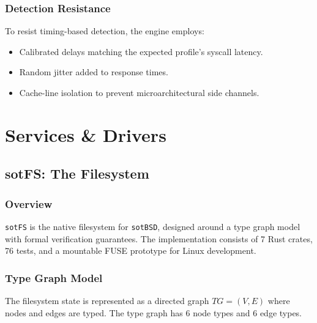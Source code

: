 \documentclass[11pt,a4paper,twoside]{report}
\theoremstyle{definition}
\newcommand{\sotBSD}{\texttt{sotBSD}}
\newcommand{\sotFS}{\texttt{sotFS}}
\begin{document}
\section{Detection Resistance}

To resist timing-based detection, the engine employs:
\begin{itemize}[leftmargin=1.4em]
  \item Calibrated delays matching the expected profile's syscall latency.
  \item Random jitter added to response times.
  \item Cache-line isolation to prevent microarchitectural side channels.
\end{itemize}


\part{Services \& Drivers}

\chapter{sotFS: The Filesystem}
\label{ch:sotfs}

\section{Overview}

\sotFS{} is the native filesystem for \sotBSD{}, designed around a type graph
model with formal verification guarantees. The implementation consists of 7
Rust crates, 76 tests, and a mountable FUSE prototype for Linux development.

\section{Type Graph Model}

The filesystem state is represented as a directed graph $TG = (V, E)$ where
nodes and edges are typed. The type graph has 6 node types and 6 edge types.
\end{document}
